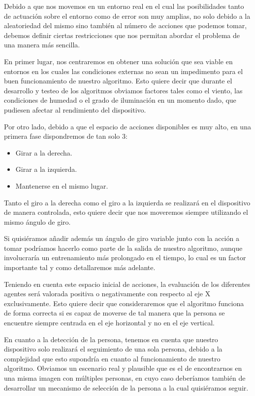 Debido a que nos movemos en un entorno real en el cual las posibilidades tanto de actuación sobre el entorno como de error son muy amplias, no solo debido a la aleatoriedad del mismo sino también al número de acciones que podemos tomar, debemos definir ciertas restricciones que nos permitan abordar el problema de una manera más sencilla.
\medskip

En primer lugar, nos centraremos en obtener una solución que sea viable en entornos en los cuales las condiciones externas no sean un impedimento para el buen funcionamiento de nuestro algoritmo. Esto quiere decir que durante el desarrollo y testeo de los algoritmos obviamos factores tales como el viento, las condiciones de humedad o el grado de iluminación en un momento dado, que pudiesen afectar al rendimiento del dispositivo.
\medskip

Por otro lado, debido a que el espacio de acciones disponibles es muy alto, en una primera fase dispondremos de tan solo 3: 

\begin{itemize}
  \item Girar a la derecha.
  \item Girar a la izquierda.
  \item Mantenerse en el mismo lugar.
\end{itemize}
\medskip

Tanto el giro a la derecha como el giro a la izquierda se realizará en el dispositivo de manera controlada, esto quiere decir que nos moveremos siempre utilizando el mismo ángulo de giro. 
\medskip

Si quisiéramos añadir además un ángulo de giro variable junto con la acción a tomar podríamos hacerlo como parte de la salida de nuestro algoritmo, aunque involucraría un entrenamiento más prolongado en el tiempo, lo cual es un factor importante tal y como detallaremos más adelante.
\medskip

Teniendo en cuenta este espacio inicial de acciones, la evaluación de los diferentes agentes será valorada positiva o negativamente con respecto al eje X exclusivamente. Esto quiere decir que consideraremos que el algoritmo funciona de forma correcta si es capaz de moverse de tal manera que la persona se encuentre siempre centrada en el eje horizontal y no en el eje vertical.
\medskip

En cuanto a la detección de la persona, tenemos en cuenta que nuestro dispositivo solo realizará el seguimiento de una sola persona, debido a la complejidad que esto supondría en cuanto al funcionamiento de nuestro algoritmo. Obviamos un escenario real y plausible que es el de encontrarnos en una misma imagen con múltiples personas, en cuyo caso deberíamos también de desarrollar un mecanismo de selección de la persona a la cual quisiéramos seguir.
\medskip


